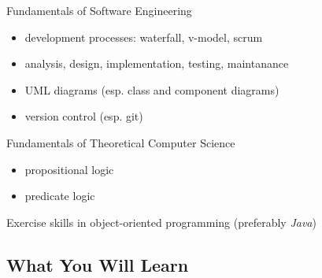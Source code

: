 \begin{frame}{\myframetitle{}}
	\begin{fancycolumns}
		\begin{note}{Fundamentals of Software Engineering}
			\begin{itemize}
				\item development processes: waterfall, v-model, scrum
				\item analysis, design, implementation, testing, maintanance
				\item UML diagrams (esp. class and component diagrams)
				\item version control (esp. git)
			\end{itemize}
		\end{note}
	\nextcolumn
		\begin{note}{Fundamentals of Theoretical Computer Science}
			\begin{itemize}
				\item propositional logic
				\item predicate logic
			\end{itemize}
		\end{note}
		\begin{note}{Exercise}
			skills in object-oriented programming (preferably \emph{Java})

		\end{note}
	\end{fancycolumns}
\end{frame}

\subsection{What You Will Learn}

\begin{frame}{\myframetitle{}}
	\frameCourseQuestions
\end{frame}

\begin{frame}{\myframetitle{}}
	\lectureseriesoverview[1]
\end{frame}

